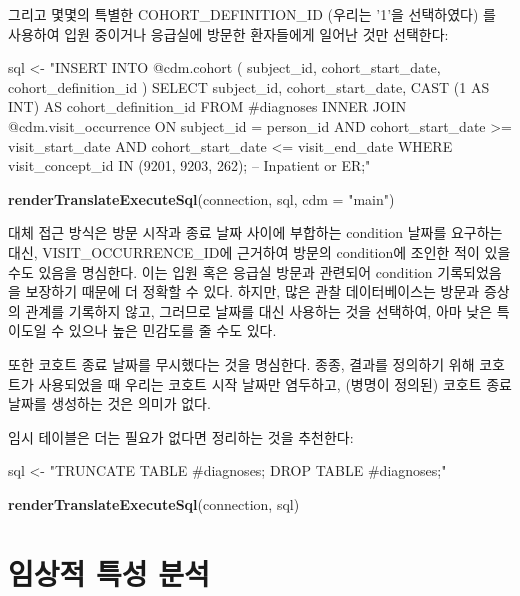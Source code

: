 \documentclass[11pt]{book}
\newenvironment{Shaded}{\begin{snugshade}}{\end{snugshade}}
\newcommand{\KeywordTok}[1]{\textcolor[rgb]{0.13,0.29,0.53}{\textbf{#1}}}
\newcommand{\DataTypeTok}[1]{\textcolor[rgb]{0.13,0.29,0.53}{#1}}
\newcommand{\StringTok}[1]{\textcolor[rgb]{0.31,0.60,0.02}{#1}}
\newcommand{\NormalTok}[1]{#1}
\theoremstyle{definition}
\theoremstyle{definition}
\theoremstyle{definition}
\theoremstyle{remark}
\begin{document}
그리고 몇몇의 특별한 COHORT\_DEFINITION\_ID (우리는 '1'을 선택하였다) 를
사용하여 입원 중이거나 응급실에 방문한 환자들에게 일어난 것만 선택한다:

\begin{Shaded}
\begin{Highlighting}[]
\NormalTok{sql <-}\StringTok{ "INSERT INTO @cdm.cohort (}
\StringTok{  subject_id, }
\StringTok{  cohort_start_date, }
\StringTok{  cohort_definition_id}
\StringTok{  )}
\StringTok{SELECT subject_id,}
\StringTok{  cohort_start_date,}
\StringTok{  CAST (1 AS INT) AS cohort_definition_id}
\StringTok{FROM #diagnoses}
\StringTok{INNER JOIN @cdm.visit_occurrence}
\StringTok{  ON subject_id = person_id}
\StringTok{    AND cohort_start_date >= visit_start_date}
\StringTok{    AND cohort_start_date <= visit_end_date}
\StringTok{WHERE visit_concept_id IN (9201, 9203, 262); -- Inpatient or ER;"}

\KeywordTok{renderTranslateExecuteSql}\NormalTok{(connection, sql, }\DataTypeTok{cdm =} \StringTok{"main"}\NormalTok{)}
\end{Highlighting}
\end{Shaded}

대체 접근 방식은 방문 시작과 종료 날짜 사이에 부합하는 condition 날짜를
요구하는 대신, VISIT\_OCCURRENCE\_ID에 근거하여 방문의 condition에
조인한 적이 있을 수도 있음을 명심한다. 이는 입원 혹은 응급실 방문과
관련되어 condition 기록되었음을 보장하기 때문에 더 정확할 수 있다.
하지만, 많은 관찰 데이터베이스는 방문과 증상의 관계를 기록하지 않고,
그러므로 날짜를 대신 사용하는 것을 선택하여, 아마 낮은 특이도일 수
있으나 높은 민감도를 줄 수도 있다.

또한 코호트 종료 날짜를 무시했다는 것을 명심한다. 종종, 결과를 정의하기
위해 코호트가 사용되었을 때 우리는 코호트 시작 날짜만 염두하고, (병명이
정의된) 코호트 종료 날짜를 생성하는 것은 의미가 없다.

임시 테이블은 더는 필요가 없다면 정리하는 것을 추천한다:

\begin{Shaded}
\begin{Highlighting}[]
\NormalTok{sql <-}\StringTok{ "TRUNCATE TABLE #diagnoses;}
\StringTok{DROP TABLE #diagnoses;"}

\KeywordTok{renderTranslateExecuteSql}\NormalTok{(connection, sql)}
\end{Highlighting}
\end{Shaded}

\section{임상적 특성 분석}\label{Characterizationanswers}
\end{document}
